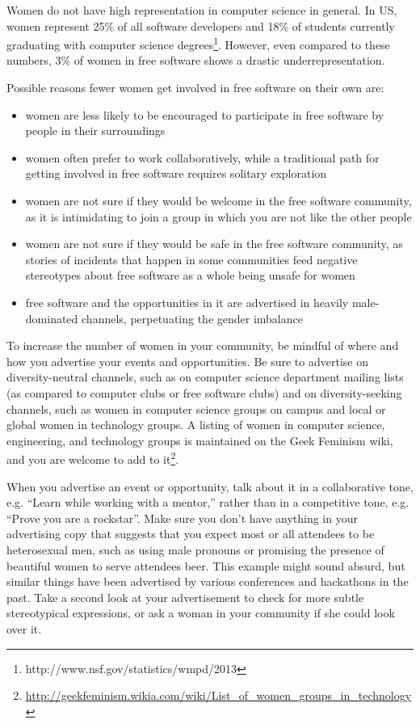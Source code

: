 Women do not have high representation in computer science in general. In US, women represent 25\% of all software developers and 18\% of students currently graduating with computer science degrees\footnote{http://www.nsf.gov/statistics/wmpd/2013}. However, even compared to these numbers, 3\% of women in free software shows a drastic underrepresentation.

Possible reasons fewer women get involved in free software on their own are:
\begin{itemize}
 \item women are less likely to be encouraged to participate in free software by people in their surroundings
 \item women often prefer to work collaboratively, while a traditional path for getting involved in free software requires solitary exploration
 \item women are not sure if they would be welcome in the free software community, as it is intimidating to join a group in which you are not like the other people
 \item women are not sure if they would be safe in the free software community, as stories of incidents that happen in some communities feed negative stereotypes about free software as a whole being unsafe for women
 \item free software and the opportunities in it are advertised in heavily male-dominated channels, perpetuating the gender imbalance
\end{itemize}

To increase the number of women in your community, be mindful of where and how you advertise your events and opportunities. Be sure to advertise on diversity-neutral channels, such as on computer science department mailing lists (as compared to computer clubs or free software clubs) and on diversity-seeking channels, such as women in computer science groups on campus and local or global women in technology groups. A listing of women in computer science, engineering, and technology groups is maintained on the Geek Feminism wiki, and you are welcome to add to it\footnote{\url{http://geekfeminism.wikia.com/wiki/List_of_women_groups_in_technology}}.

When you advertise an event or opportunity, talk about it in a collaborative tone, e.g.  “Learn while working with a mentor,” rather than in a competitive tone, e.g. “Prove you are a rockstar”. Make sure you don’t have anything in your advertising copy that suggests that you expect most or all attendees to be heterosexual men, such as using male pronouns or promising the presence of beautiful women to serve attendees beer. This example might sound absurd, but similar things have been advertised by various conferences and hackathons in the past. Take a second look at your advertisement to check for more subtle stereotypical expressions, or ask a woman in your community if she could look over it.

